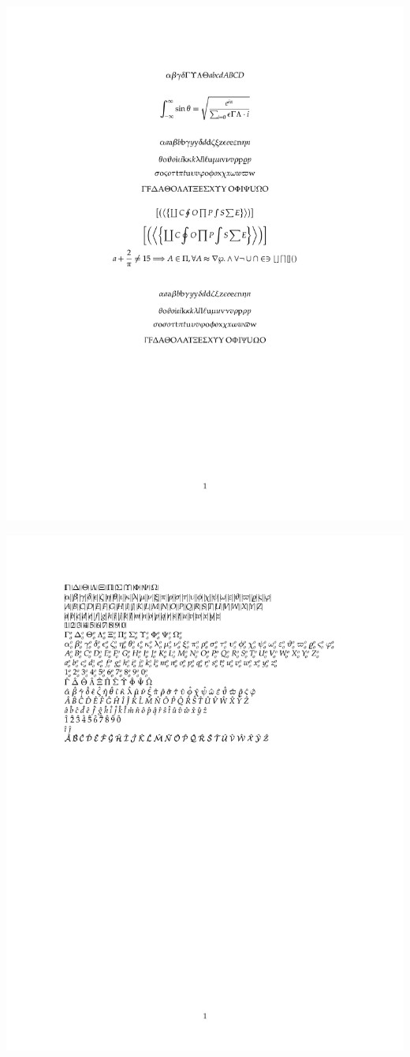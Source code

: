 \documentclass[twocolumn]{article}
\begin{document}
 \noindent\includegraphics*{../results/palatino-font}\par
{} \noindent\includegraphics*{../results/palatino-pos}\par
\end{document}
